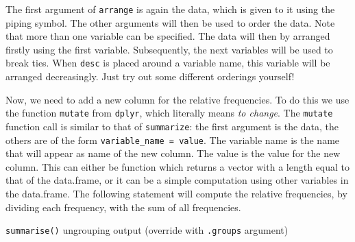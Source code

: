 \documentclass[]{tufte-book}
\newenvironment{Shaded}{}{}
\newcommand{\DataTypeTok}[1]{\textcolor[rgb]{0.56,0.13,0.00}{#1}}
\newcommand{\KeywordTok}[1]{\textcolor[rgb]{0.00,0.44,0.13}{\textbf{#1}}}
\newcommand{\NormalTok}[1]{#1}
\newcommand{\OperatorTok}[1]{\textcolor[rgb]{0.40,0.40,0.40}{#1}}
\newcommand{\StringTok}[1]{\textcolor[rgb]{0.25,0.44,0.63}{#1}}
\begin{document}
The first argument of \texttt{arrange} is again the data, which is given to it using the piping symbol. The other arguments will then be used to order the data. Note that more than one variable can be specified. The data will then by arranged firstly using the first variable. Subsequently, the next variables will be used to break ties. When \texttt{desc} is placed around a variable name, this variable will be arranged decreasingly. Just try out some different orderings yourself!

Now, we need to add a new column for the relative frequencies. To do this we use the function \texttt{mutate} from \texttt{dplyr}, which literally means \emph{to change}. The \texttt{mutate} function call is similar to that of \texttt{summarize}: the first argument is the data, the others are of the form \texttt{variable\_name\ =\ value}. The variable name is the name that will appear as name of the new column. The value is the value for the new column. This can either be function which returns a vector with a length equal to that of the data.frame, or it can be a simple computation using other variables in the data.frame. The following statement will compute the relative frequencies, by dividing each frequency, with the sum of all frequencies.

\begin{Shaded}
\end{Shaded}

\texttt{summarise()} ungrouping output (override with \texttt{.groups} argument)
\end{document}
